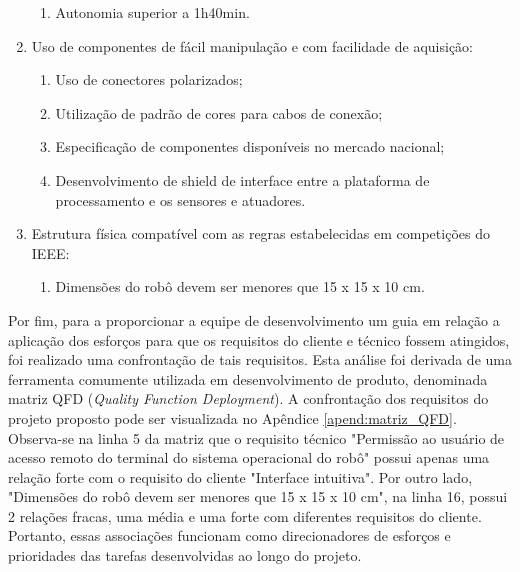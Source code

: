 \begin{enumerate}
\begin{enumerate}
		\item Autonomia superior a 1h40min.
	\end{enumerate}
	
	\item Uso de componentes de fácil manipulação e com facilidade de aquisição:
	\begin{enumerate}
		\item Uso de conectores polarizados;
		
		\item Utilização de padrão de cores para cabos de conexão;
		
		\item Especificação de componentes disponíveis no mercado nacional;
		
		\item Desenvolvimento de shield de interface entre a plataforma de processamento e os sensores e atuadores.
	\end{enumerate}
	
	\item Estrutura física compatível com as regras estabelecidas em competições do IEEE:
	\begin{enumerate}
		\item Dimensões do robô devem ser menores que 15 x 15 x 10 cm.
	\end{enumerate}
\end{enumerate}

Por fim, para a proporcionar a equipe de desenvolvimento um guia em relação a aplicação dos esforços para que os requisitos do cliente e técnico fossem atingidos, foi realizado uma confrontação de tais requisitos. Esta análise foi derivada de uma ferramenta comumente utilizada em desenvolvimento de produto, denominada matriz QFD (\textit{Quality Function Deployment}). A confrontação dos requisitos do projeto proposto pode ser visualizada no Apêndice \ref{apend:matriz_QFD}. Observa-se na linha 5 da matriz que o requisito técnico "Permissão ao usuário de acesso remoto do terminal do sistema operacional do robô" possui apenas uma relação forte com o requisito do cliente "Interface intuitiva". Por outro lado, "Dimensões do robô devem ser menores que 15 x 15 x 10 cm", na linha 16, possui 2 relações fracas, uma média e uma forte com diferentes requisitos do cliente. Portanto, essas associações funcionam como direcionadores de esforços e prioridades das tarefas desenvolvidas ao longo do projeto.

